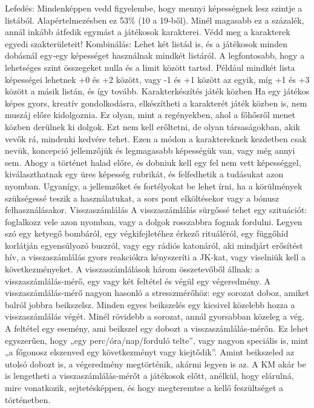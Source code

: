 \documentclass[oneside]{book}
\begin{document}
Lefedés: Mindenképpen vedd figyelembe, hogy mennyi képességnek lesz szintje a listából. Alapértelmezésben ez 53\% (10 a 19‑ből). Minél magasabb ez a százalék, annál inkább átfedik egymást a játékosok karakterei. Védd meg a karakterek egyedi szakterületeit!
Kombinálás: Lehet két listád is, és a játékosok minden dobásnál egy‑egy képességet használnak mindkét listáról. A legfontosabb, hogy a lehetséges szint összegeket nulla és a limit között tartsd. Például mindkét lista képességei lehetnek +0 és +2 között, vagy -1 és +1 között az egyik, míg +1 és +3 között a másik listán, és így tovább.
Karakterkészítés játék közben
Ha egy játékos képes gyors, kreatív gondolkodásra, elkészítheti a karakterét játék közben is, nem muszáj előre kidolgoznia. Ez olyan, mint a regényekben, ahol a főhősről menet közben derülnek ki dolgok. Ezt nem kell erőltetni, de olyan társaságokban, akik vevők rá, mindenki kedvére tehet.
Ezen a módon a karaktereknek kezdetben csak nevük, koncepció jellemzőjük és legmagasabb képességük van, vagy még annyi sem. Ahogy a történet halad előre, és dobniuk kell egy fel nem vett képességgel, kiválaszthatnak egy üres képesség rubrikát, és felfedhetik a tudásukat azon nyomban. Ugyanígy, a jellemzőket és fortélyokat be lehet írni, ha a körülmények szükségessé teszik a használatukat, a sors pont elköltésekor vagy a bónusz felhasználásakor.
Visszaszámlálás
A visszaszámlálás sürgőssé tehet egy szituációt: foglalkozz vele azon nyomban, vagy a dolgok rosszabbra fognak fordulni. Legyen szó egy ketyegő bombáról, egy végkifejletéhez érkező rituáléról, egy függőhíd korlátján egyensúlyozó buszról, vagy egy rádiós katonáról, aki mindjárt erősítést hív, a visszaszámlálás gyors reakciókra kényszeríti a JK‑kat, vagy viselniük kell a következményeket.
A visszaszámlálások három összetevőből állnak: a visszaszámlálás‑mérő, egy vagy két feltétel és végül egy végeredmény.
A visszaszámlálás‑mérő nagyon hasonló a stresszmérőhöz: egy sorozat doboz, amiket balról jobbra beikszelsz. Minden egyes beikszelés egy kicsivel közelebb hozza a visszaszámlálás végét. Minél rövidebb a sorozat, annál gyorsabban közeleg a vég.
A feltétel egy esemény, ami beikszel egy dobozt a visszaszámlálás‑mérőn. Ez lehet egyszerűen, hogy „egy perc/óra/nap/forduló telte”, vagy nagyon speciális is, mint „a főgonosz elszenved egy következményt vagy kiejtődik”.
Amint beikszeled az utolsó dobozt is, a végeredmény megtörténik, akármi legyen is az.
A KM akár be is lengetheti a visszaszámlálás‑mérőt a játékosok előtt, anélkül, hogy elárulná, mire vonatkozik, sejtetésképpen, és hogy megteremtse a kellő feszültséget a történetben.
\end{document}
